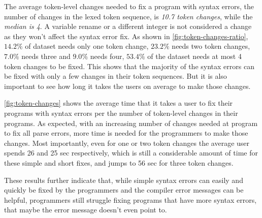 The average token-level changes needed to fix a program with syntax errors, \ie
the number of changes in the lexed token sequence, is \emph{10.7 token changes},
while the \emph{median is 4}. A variable rename or a different integer is not
considered a change as they won't affect the syntax error fix. As shown in
\autoref{fig:token-changes-ratio}, $14.2\%$ of dataset needs only one token
change, $23.2\%$ needs two token changes, $7.0\%$ needs three and $9.0\%$ needs
four, \ie $53.4\%$ of the dataset needs at most 4 token changes to be fixed.
This shows that the majority of the syntax errors can be fixed with only a few
changes in their token sequences. But it is also important to see how long it
takes the users on average to make those changes.

\autoref{fig:token-changes} shows the average time that it takes a user to fix
their programs with syntax errors per the number of token-level changes in their
programs. As expected, with an increasing number of changes needed at program to
fix all parse errors, more time is needed for the programmers to make those
changes. Most importantly, even for one or two token changes the average user
spends 26 and 25 sec respectively, which is still a considerable amount of time
for these simple and short fixes, and jumps to 56 sec for three token changes.

These results further indicate that, while simple syntax errors can easily and
quickly be fixed by the programmers and the compiler error messages can be
helpful, programmers still struggle fixing programs that have more syntax
errors, that maybe the error message doesn't even point to.
